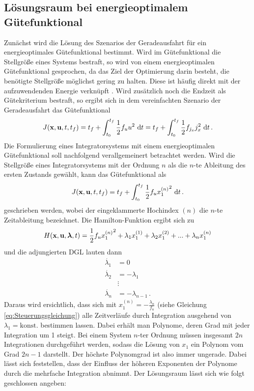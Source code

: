 \subsection{Lösungsraum bei energieoptimalem Gütefunktional}\label{subsec:Lösungsraum_Geradeausfahrt}
Zunächst wird die Lösung des Szenarios der Geradeausfahrt für ein energieoptimales Gütefunktional bestimmt. Wird im Gütefunktional die Stellgröße eines Systems bestraft, so wird von einem energieoptimalen Gütefunktional gesprochen, da das Ziel der Optimierung darin besteht, die benötigte Stellgröße möglichst gering zu halten. Diese ist häufig direkt mit der aufzuwendenden Energie verknüpft \cite{KnutGraichen.2012}. Wird zusätzlich noch die Endzeit als Gütekriterium bestraft, so ergibt sich in dem vereinfachten Szenario der Geradeausfahrt das Gütefunktional
\begin{equation}
	J(\boldsymbol{\mathrm{x}},\boldsymbol{\mathrm{u}},t,t_f) = t_f + \int_{t_0}^{t_f}\frac{1}{2}f_uu^2~\textrm{d}{t} = t_f + \int_{t_0}^{t_f}\frac{1}{2}f_{j_x} j_x^2~\textrm{d}{t}\,.
\end{equation}
Die Formulierung eines Integratorsystems mit einem energieoptimalen Gütefunktional soll nachfolgend verallgemeinert betrachtet werden. Wird die Stellgröße eines Integratorsystems mit der Ordnung $n$ als die $n$-te Ableitung des ersten Zustands gewählt, kann das Gütefunktional als 
\begin{equation}
J(\boldsymbol{\mathrm{x}},\boldsymbol{\mathrm{u}},t,t_f) = t_f + \int_{t_0}^{t_f}\frac{1}{2}f_u{x_1^{(n)}}^2~\textrm{d}{t}\,.
\end{equation}
geschrieben werden, wobei der eingeklammerte Hochindex $(n)$ die $n$-te Zeitableitung bezeichnet. Die Hamilton-Funktion ergibt sich zu
\begin{equation}
H(\boldsymbol{\mathrm{x}},\boldsymbol{\mathrm{u}},\boldsymbol{\mathrm{\lambda}},t) = \frac{1}{2}f_u{x_1^{(n)}}^2 + \lambda_1x_1^{(1)} + \lambda_2x_1^{(2)} + ... + \lambda_nx_1^{(n)}
\end{equation}
und die adjungierten \gls{DGL} lauten dann  
\begin{align}
	\dot{\lambda_1} &= 0 \\
	\dot{\lambda_2} &= -\lambda_1 \\
	&\vdots \\
	\dot{\lambda_n} &= -\lambda_{n-1}\,.
\end{align}
Daraus wird ersichtlich, dass sich mit $x_1^{(n)} = -\frac{\lambda_n}{f_u}$ (siehe Gleichung \eqref{eq:Steuerungsgleichung}) alle Zeitverläufe durch Integration ausgehend von $\lambda_1 = \textrm{konst.}$ bestimmen lassen. Dabei erhält man Polynome, deren Grad mit jeder Integration um 1 steigt. Bei einem System $n$-ter Ordnung müssen insgesamt $2n$ Integrationen durchgeführt werden, sodass die Lösung von $x_1$ ein Polynom vom Grad $2n-1$ darstellt. Der höchste Polynomgrad ist also immer ungerade. Dabei lässt sich feststellen, dass der Einfluss der höheren Exponenten der Polynome durch die mehrfache Integration abnimmt. Der Lösungsraum lässt sich wie folgt geschlossen angeben: 
